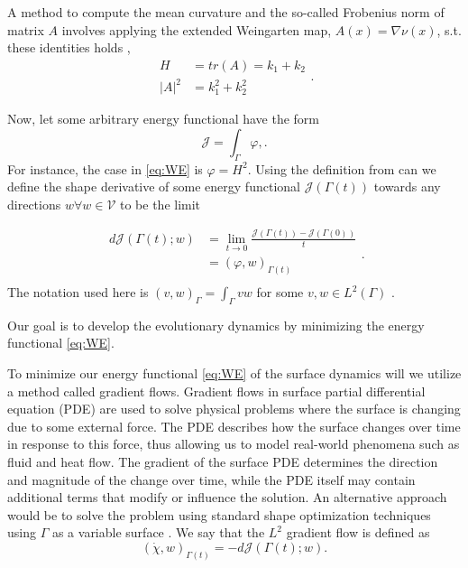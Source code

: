 A method to compute the mean curvature and the so-called Frobenius norm of matrix $A$ involves applying the
extended Weingarten map, $ A\left( x \right) = \nabla \nu \left( x \right) $, s.t. these identities holds \cite{kovacs2021convergent},
\begin{equation*}
    \begin{split}
    H & = tr(A) = k_{1} + k_{2} \\
    \left\lvert A \right\rvert^{2}  & = k_{1}^2 + k_{2}^2
    \end{split}
.\end{equation*}

Now, let some arbitrary energy functional have the form
\[
\mathcal{J} = \int_{\Gamma }^{} \varphi,.
\]
For instance, the case in \eqref{eq:WE} is $\varphi = H ^2$.
Using the definition from \cite{bonito2010parametric, troltzsch2010optimal} can we define the shape derivative of some energy
functional $\mathcal{J} \left( \Gamma \left( t \right)  \right)  $ towards any directions $ w \forall w \in \mathcal{V}  $  to be the limit

\begin{equation*}
    \begin{split}
d\mathcal{J} \left( \Gamma \left( t \right) ; w  \right)  & = \lim_{t \to 0} \frac{\mathcal{J}\left( \Gamma \left( t \right)  \right) - \mathcal{J} (  \Gamma \left( 0 \right))}{t} \\
&= \left(  \varphi ,w\right)_{\Gamma \left( t \right) }  \\
    \end{split}
.\end{equation*}
 The notation used here is $\left( v,w \right)_{\Gamma } = \int_{\Gamma }^{}  vw   $ for some $ v,w \in L^{2}\left( \Gamma \right) $ .

Our goal is to develop the evolutionary dynamics by minimizing the energy functional \eqref{eq:WE}.

To minimize our energy functional \eqref{eq:WE} of the surface dynamics will we utilize a method called gradient flows. Gradient flows in surface partial differential equation (PDE) are used to solve physical problems where the surface is changing due to some external force. The PDE describes how the surface changes over time in response to this force, thus allowing us to model real-world phenomena such as fluid and heat flow. The gradient of the surface PDE determines the direction and magnitude of the change over time, while the PDE itself may contain additional terms that modify or influence the solution. \cite{dogan2007discrete} An alternative approach would be to solve the problem using standard shape optimization techniques using $\Gamma$ as a variable surface \cite{dalphin2014study}.
We say that the $L^{2}$  gradient flow is defined as
\[
\left( \dot{\chi } , w \right)_{\Gamma \left( t \right)  } = -d\mathcal{J}\left( \Gamma \left( t \right); w  \right).
\]


